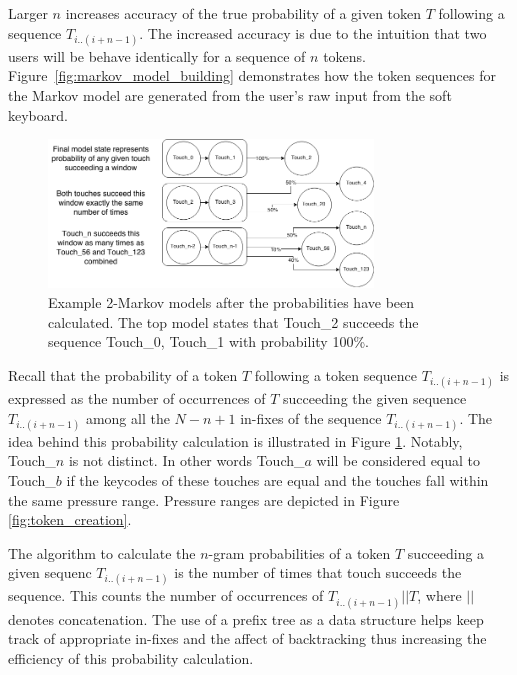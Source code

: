 \documentclass{acm_proc_article-sp}
\begin{document}
Larger $n$ increases accuracy of the true probability of a given token $T$ following
a sequence $T_{i..(i+n-1)}$. The increased accuracy is due to the intuition that 
two users will be behave identically for  a sequence of $n$ tokens.
Figure~\ref{fig:markov_model_building} demonstrates how the token sequences for the Markov model are generated from the user's raw input from the soft keyboard.

\begin{figure}
\centering
\includegraphics[width=3.4in]{figures/final_Markov_model_state.png}
\caption{Example 2-Markov models after the probabilities have been calculated. The top 
model states that Touch\_2 succeeds the sequence Touch\_0, Touch\_1 with probability 100\%.}
\label{fig:final_markov_model_state}
\end{figure}

Recall that the probability of a token $T$ following  a token sequence $T_{i..(i+n-1)}$ is 
expressed as the number of occurrences of $T$ succeeding the given sequence $T_{i..(i+n-1)}$ among
all the $N-n+1$ in-fixes of the sequence $T_{i..(i+n-1)}$.
The idea behind this probability calculation is illustrated in Figure \ref{fig:final_markov_model_state}.
Notably, Touch\_$n$ is not distinct. In other words Touch\_$a$ will be considered equal to Touch\_$b$ if the keycodes of these touches are equal and the touches fall within the same pressure range. Pressure ranges are depicted in Figure \ref{fig:token_creation}.

The algorithm to calculate the $n$-gram probabilities of a token $T$ succeeding a given sequenc
$T_{i..(i+n-1)}$ is the number of times that touch succeeds the sequence. This counts the  number of 
occurrences of $T_{i..(i+n-1)}||T$, where $||$ denotes concatenation.
The use of a prefix tree as a data structure helps keep track of appropriate
in-fixes and the affect of backtracking thus increasing the efficiency of this probability calculation.
\end{document}
